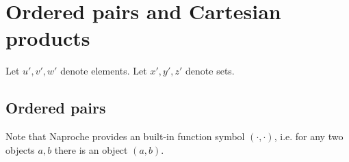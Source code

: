 \documentclass[../../sets-and-functions.ftl.tex]{subfiles}
\begin{document}
  \section{Ordered pairs and Cartesian products}

  \begin{forthel}
    Let $u',v',w'$ denote elements.
    Let $x',y',z'$ denote sets.
  \end{forthel}


  \subsection{Ordered pairs}

  Note that Naproche provides an built-in function symbol $(\cdot,\cdot)$, i.e. for any two objects $a,b$ there is an object $(a,b)$.
\end{document}
